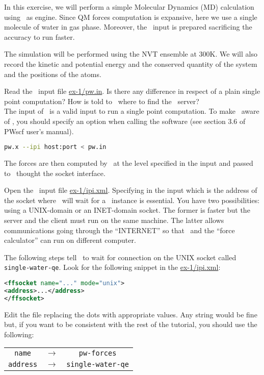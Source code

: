 \documentclass{article}
\begin{document}
\begin{Exercise}[label={i-pi},title={Molecular Dynamics: a client/server approach}]

In this exercise, we will perform a simple Molecular Dynamics (MD)
calculation using \PWscf\ as engine. Since QM forces computation is
expansive, here we use a single molecule of water in gas phase. Moreover, the
\PWscf\ input is prepared sacrificing the accuracy to run faster.

The simulation will be performed using the NVT ensemble at 300K.  We
will also record the kinetic and potential energy and the conserved
quantity of the system and the positions of the atoms.

\Question
Read the \PWscf\ input file \url{ex-1/pw.in}.
Is there any difference in respect of a plain single point computation?
How is told to \pwx\ where to find the \ipi\ server?\\

The input of \pwx\ is a valid input to run a single point
computation. To make \pwx\ aware of \ipi, you should specify an option
when calling the software (see section 3.6 of PWscf user's manual).
\begin{lstlisting}[language=bash]
pw.x --ipi host:port < pw.in
\end{lstlisting}
The forces are then computed by \pwx\ at the level specified in the
input and passed to \ipi\ thought the socket interface.

\Question 
Open the \ipi\ input file \url{ex-1/ipi.xml}. Specifying in
the input which is the address of the socket where \ipi\ will wait for a \pwx\
instance is essential. You have two possibilities: using a UNIX-domain
or an INET-domain socket. The former is faster but the server and the
client must run on the same machine. The latter allows communications
going through the ``INTERNET'' so that \ipi\ and the ``force
calculator'' can run on different computer.

The following steps tell \ipi\ to wait for connection on the UNIX
socket called \texttt{single-water-qe}. Look for the following snippet
in the \url{ex-1/ipi.xml}:
\begin{lstlisting}[language=xml]
<ffsocket name="..." mode="unix">
<address>...</address>
</ffsocket>
\end{lstlisting}
Edit the file replacing the dots with appropriate values. Any string
would be fine but, if you 
want to be consistent with the rest of the tutorial, you should use
the following:
\begin{table}[h!]
  \centering
  \begin{tabular}{ccc}
    \texttt{name} & $\longrightarrow$ & \texttt{pw-forces}\\
    \texttt{address} & $\longrightarrow$ & \texttt{single-water-qe}
  \end{tabular}
\end{table}



\end{Exercise}
\end{document}
